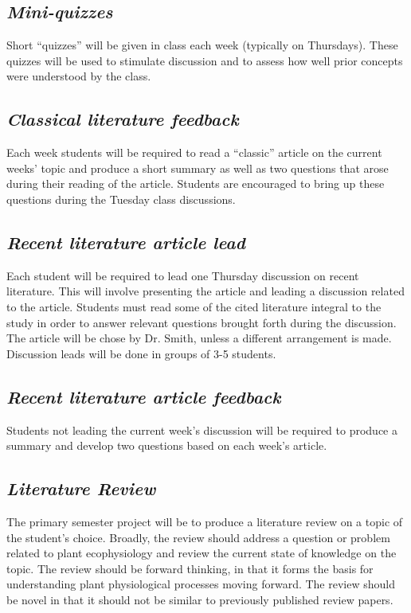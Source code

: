 \documentclass[12pt, notitlepage]{article}   	%
\begin{document}
{\subsection{\textit{Mini-quizzes}}
Short “quizzes” will be given in class each week (typically on Thursdays). 
These quizzes will be used to stimulate discussion and to assess how well 
prior concepts were understood by the class.

\subsection{\textit{Classical literature feedback}}
Each week students will be required to read a “classic” article on the current weeks’ 
topic and produce a short summary as well as two questions that arose during their 
reading of the article. Students are encouraged to bring up these questions during the
Tuesday class discussions.

\subsection{\textit{Recent literature article lead}}
Each student will be required to lead one Thursday discussion on recent literature. 
This will involve presenting the article 
and leading a discussion related to the article. Students must read some of the cited
literature integral to the study 
in order to answer relevant questions brought forth during the discussion.
The article will be chose by Dr. Smith, unless a different arrangement is made.
Discussion leads will be done in groups of 3-5 students.

\subsection{\textit{Recent literature article feedback}}
Students not leading the current week’s 
discussion will be required to produce a summary and 
develop two questions based on each week’s article.

\subsection{\textit{Literature Review}}
The primary semester project will be to produce a literature review on a topic 
of the student's choice.
Broadly, the review should address a question or problem related 
to plant ecophysiology and review the current state of knowledge on the topic.
The review should be forward thinking, in that it forms the
basis for understanding plant physiological processes moving forward.
The review should be novel in that it should not be similar to previously published
review papers.

}
\end{document}
